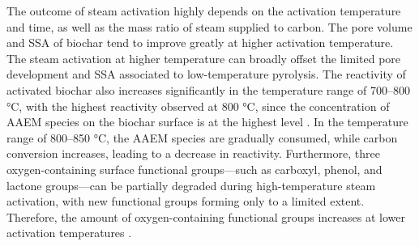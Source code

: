 \vspace{0.3em}



\vspace{0.3em}

The outcome of steam activation highly depends on the activation temperature and time, as well as the mass ratio of steam supplied to carbon. The pore volume and SSA of biochar tend to improve greatly at higher activation temperature. The steam activation at higher temperature can broadly offset the limited pore development and SSA associated to low-temperature pyrolysis. The reactivity of activated biochar also increases significantly in the temperature range of 700–800 °C, with the highest reactivity observed at 800 °C, since the concentration of AAEM species on the biochar surface is at the highest level \cite{Sajjadi2019}. In the temperature range of 800–850 °C, the AAEM species are gradually consumed, while carbon conversion increases, leading to a decrease in reactivity. Furthermore, three oxygen-containing surface functional groups—such as carboxyl, phenol, and lactone groups—can be partially degraded during high-temperature steam activation, with new functional groups forming only to a limited extent. Therefore, the amount of oxygen-containing functional groups increases at lower activation temperatures \cite{Sajjadi2019}. 

